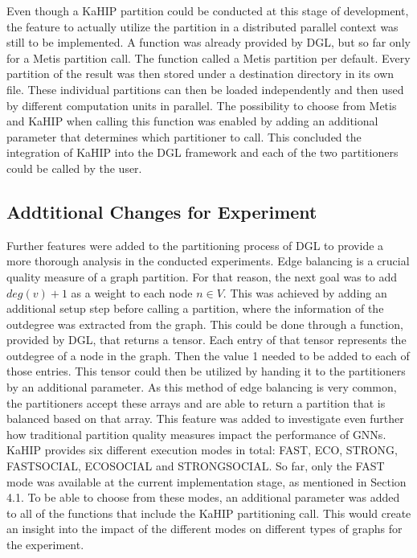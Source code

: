 \documentclass[acmsmall,nonacm,screen,review]{acmart}
\begin{document}
Even though a KaHIP partition could be conducted at this stage of development, the feature to actually utilize the partition in a distributed parallel context was still to be implemented. A function was already provided by DGL, but so far only for a Metis partition call. The function called a Metis partition per default. Every partition of the result was then stored under a destination directory in its own file. These individual partitions can then be loaded independently and then used by different computation units in parallel. The possibility to choose from Metis and KaHIP when calling this function was enabled by adding an additional parameter that determines which partitioner to call. This concluded the integration of KaHIP into the DGL framework and each of the two partitioners could be called by the user.
\subsection{Addtitional Changes for Experiment}
Further features were added to the partitioning process of DGL to provide a more thorough analysis in the conducted experiments. Edge balancing is a crucial quality measure of a graph partition. For that reason, the next goal was to add $deg(v) + 1$ as a weight to each node $n \in V$. This was achieved by adding an additional setup step before calling a partition, where the information of the outdegree was extracted from the graph. This could be done through a function, provided by DGL, that returns a tensor. Each entry of that tensor represents the outdegree of a node in the graph. Then the value 1 needed to be added to each of those entries. This tensor could then be utilized by handing it to the partitioners by an additional parameter. As this method of edge balancing is very common, the partitioners accept these arrays and are able to return a partition that is balanced based on that array. This feature was added to investigate even further how traditional partition quality measures impact the performance of GNNs. \\
KaHIP provides six different execution modes in total: FAST, ECO, STRONG, FASTSOCIAL, ECOSOCIAL and STRONGSOCIAL. So far, only the FAST mode was available at the current implementation stage, as mentioned in Section 4.1. To be able to choose from these modes, an additional parameter was added to all of the functions that include the KaHIP partitioning call. This would create an insight into the impact of the different modes on different types of graphs for the experiment.
\end{document}

